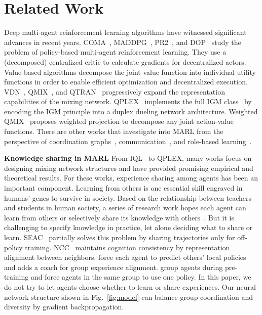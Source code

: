 \section{Related Work}
\label{relate}

Deep multi-agent reinforcement learning algorithms have witnessed significant advances in recent years. COMA~\cite{foerster2018counterfactual}, MADDPG~\cite{lowe2017multi}, PR2~\cite{wen2019probabilistic}, and DOP~\cite{wang2021off} study the problem of policy-based multi-agent reinforcement learning. They use a (decomposed) centralized critic to calculate gradients for decentralized actors. Value-based algorithms decompose the joint value function into individual utility functions in order to enable efficient optimization and decentralized execution. VDN~\cite{sunehag2018value}, QMIX~\cite{rashid2018qmix}, and QTRAN~\cite{son2019qtran} progressively expand the representation capabilities of the mixing network. QPLEX~\cite{wang2020qplex} implements the full IGM class~\cite{son2019qtran} by encoding the IGM principle into a duplex dueling network architecture. Weighted QMIX~\cite{rashid2020weighted} proposes weighted projection to decompose any joint action-value functions. There are other works that investigate into MARL from the perspective of coordination graphs~\cite{guestrin2002coordinated, guestrin2002multiagent, bohmer2020deep}, communication~\cite{singh2019learning, mao2020neighborhood, wang2020learning}, and role-based learning~\cite{wang2020roma, wang2021rode}.

\textbf{Knowledge sharing in MARL} From IQL~\cite{tan1993multi} to QPLEX, many works focus on designing mixing network structures and have provided promising empirical and theoretical results. For these works, experience sharing among agents has been an important component. Learning from others is one essential skill engraved in humans' genes to survive in society. Based on the relationship between teachers and students in human society, a series of research work hopes each agent can learn from others or selectively share its knowledge with others~\cite{zhu2019q,liang2020parallel,fu2020auto}. But it is challenging to specify knowledge in practice, let alone deciding what to share or learn. SEAC~\cite{christianos2020shared} partially solves this problem by sharing trajectories only for off-policy training. NCC~\cite{mao2020neighborhood} maintains cognition consistency by representation alignment between neighbors. \citet{roy2020promoting} force each agent to predict others' local policies and adds a coach for group experience alignment. \citet{christianos2021scaling} group agents during pre-training and force agents in the same group to use one policy. In this paper, we do not try to let agents choose whether to learn or share experiences. Our neural network structure shown in Fig.~\ref{fig:model} can balance group coordination and diversity by gradient backpropagation. 



